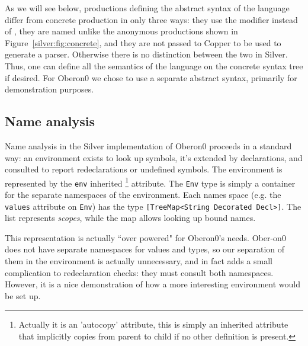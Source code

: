 As we will see below, productions defining the abstract syntax of the
language differ from concrete production in only three ways: they use
the  modifier instead of , they are named
unlike the anonymous productions shown in
Figure~\ref{silver:fig:concrete}, and they are not passed to Copper to
be used to generate a parser.  Otherwise there is no distinction
between the two in Silver.  Thus, one can define all the semantics of
the language on the concrete syntax tree if desired.  For Oberon0 we
chose to use a separate abstract syntax, primarily for demonstration
purposes.



\subsection{Name analysis}

Name analysis in the Silver implementation of Oberon0 proceeds in a standard
way: an environment exists to look up symbols, it's extended by declarations,
and consulted to report redeclarations or undefined symbols.
%
The environment is represented by the \texttt{env} inherited
 \footnote{Actually it is an 'autocopy' attribute, this is simply an inherited attribute
 that implicitly copies from parent to child if no other definition is present.}
attribute.
%
%
The \texttt{Env} type is simply a container for the separate namespaces of the
environment.
%
Each names space (e.g. the \texttt{values} attribute on \texttt{Env}) has the
type \texttt{[TreeMap<String  Decorated Decl>]}.
%
The list represents \textit{scopes}, while the map allows looking up bound
names.

This representation is actually ``over powered" for Oberon0's needs.
%
Ober-on0 does not have separate namespaces for values and types, so our
separation of them in the environment is actually unnecessary, and in fact
adds a small complication to redeclaration checks: they must consult both
namespaces.
%
However, it is a nice demonstration of how a more interesting environment
would be set up.

%

